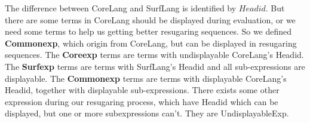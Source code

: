 \begin{centering}
	\framebox[38em][c]{
		\parbox[t]{38em}{
			\[
			\begin{array}{rcl}
			\mbox{Exp} &::=& \mbox{DisplayableExp}\\
			&|& \mbox{UndisplayableExp}\\
			\end{array}
			\]
			\[
			\begin{array}{rcl}
			\mbox{DisplayableExp} &::=& \mbox{Surfexp}\\
			&|& \mbox{Commonexp}
			\end{array}
			\]

			\[
			\begin{array}{rcl}
			\mbox{UndisplayableExp} &::=& \mbox{Coreexp}\\
			&|& \mbox{OtherSurfexp}\\
			&|& \mbox{OtherCommonexp}
			\end{array}
			\]
			
			\[
			\begin{array}{rcl}
			\mbox{Coreexp} &::=& (\mbox{CoreHead}~\mbox{Exp}*)
			\end{array}
			\]
			
			\[
			\begin{array}{rcl}
			\mbox{Surfexp} &::=& (\mbox{SurfHead}~\mbox{DisplayableExp}*)
			\end{array}
			\]
			
			\[
			\begin{array}{rcl}
			\mbox{Commonexp} &::=& (\mbox{CommonHead}~\mbox{DisplayableExp}*)\\
			&|& \mbox{Value}\\
			&|& \mbox{Variable}
			\end{array}
			\]
			
			\[
			\begin{array}{rcl}
			\mbox{OtherSurfexp} &::=& (\mbox{SurfHead}~\mbox{Exp}*~\mbox{UndisplayableExp}~\mbox{Exp}*)
			\end{array}
			\]
			
			\[
			\begin{array}{rcl}
			\mbox{OtherCommonexp} &::=& (\mbox{CommonHead}~\mbox{Exp}*~\mbox{UndisplayableExp}~\mbox{Exp}*)
			\end{array}
			\]
		}
	}
\end{centering}

The difference between CoreLang and SurfLang is identified by $Headid$. But there are some terms in CoreLang should be displayed during evaluation, or we need some terms to help us getting better resugaring sequences. So we defined {\bfseries Commonexp}, which origin from CoreLang, but can be displayed in resugaring sequences. The {\bfseries Coreexp} terms are terms with undisplayable CoreLang's Headid. The {\bfseries Surfexp} terms are terms with SurfLang's Headid and all sub-expressions are displayable. The {\bfseries Commonexp} terms are terms with displayable CoreLang's Headid, together with displayable sub-expressions. There exists some other expression during our resugaring process, which have Headid which can be displayed, but one or more subexpressions can't. They are UndisplayableExp.

